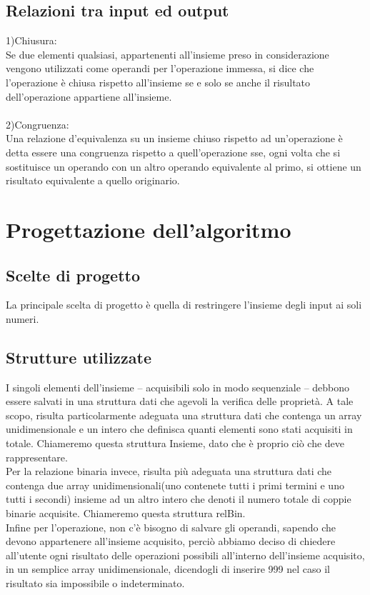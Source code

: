 \documentclass[11pt,a4paper,titlepage,block]{article}
\begin{document}
	\subsection{Relazioni tra input ed output}
	1)Chiusura:\\
	Se due elementi qualsiasi, appartenenti all'insieme preso in considerazione vengono utilizzati come operandi per l'operazione immessa, si dice che l'operazione è chiusa rispetto all'insieme se e solo se anche il risultato dell'operazione appartiene all'insieme.
	\\
	\\
	2)Congruenza:\\Una relazione d'equivalenza su un insieme chiuso rispetto ad un'operazione è detta essere una congruenza
	rispetto a quell'operazione sse, ogni volta che si sostituisce un operando con un altro operando
	equivalente al primo, si ottiene un risultato equivalente a quello originario.
	\newpage
	\section{Progettazione dell'algoritmo}
	\subsection{Scelte di progetto}
	La principale scelta di progetto è quella di restringere l'insieme degli input ai soli numeri.
	\subsection{Strutture utilizzate}
	I singoli elementi dell'insieme – acquisibili solo in modo sequenziale – debbono essere salvati in una struttura
	dati che agevoli la verifica delle proprietà.  A tale scopo, risulta particolarmente
	adeguata una struttura dati che contenga un array unidimensionale e un intero che definisca quanti elementi sono stati acquisiti in totale. Chiameremo questa struttura Insieme, dato che è proprio ciò che deve rappresentare.
	\\
	Per la relazione binaria invece, risulta più adeguata una struttura dati che contenga due array unidimensionali(uno contenete tutti i primi termini e uno tutti i secondi) insieme ad un altro intero che denoti il numero totale di coppie binarie acquisite. Chiameremo questa struttura relBin.
	\\
	Infine per l'operazione, non c'è bisogno di salvare gli operandi, sapendo che devono appartenere all'insieme acquisito, perciò abbiamo deciso di chiedere all'utente ogni risultato delle operazioni possibili all'interno dell'insieme acquisito, in un semplice array unidimensionale, dicendogli di inserire 999 nel caso il risultato sia impossibile o indeterminato.
	\\
\end{document}

